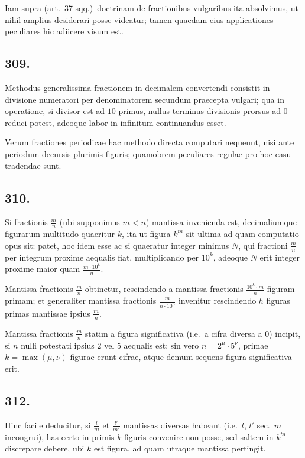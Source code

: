 \documentclass[12pt,a4paper]{article}
\theoremstyle{plain}
\theoremstyle{definition}
\theoremstyle{remark}
\begin{document}
Iam supra (art.\@~37 sqq.)\ doctrinam de fractionibus vulgaribus ita absolvimus,
ut nihil amplius desiderari posse videatur; tamen quaedam eius applicationes
peculiares hic adiicere visum est.

\subsection*{309.}

Methodus generalissima fractionem in decimalem convertendi consistit in
divisione numeratori per denominatorem secundum praecepta vulgari; qua in
operatione, si divisor est ad $10$ primus, nullus terminus divisionis prorsus
ad $0$ reduci potest, adeoque labor in infinitum continuandus esset.

Verum fractiones periodicae hac methodo directa computari nequeunt, nisi
ante periodum decursis plurimis figuris; quamobrem peculiares regulae pro hoc
casu tradendae sunt.

\subsection*{310.}

Si fractionis $\tfrac{m}{n}$ (ubi supponimus $m < n$) mantissa invenienda est,
decimaliumque figurarum multitudo quaeritur $k$, ita ut figura $k^{ta}$ sit ultima
ad quam computatio opus sit: patet, hoc idem esse ac si quaeratur integer
minimus $N$, qui fractioni $\tfrac{m}{n}$ per integrum proxime aequalis fiat, multiplicando
per $10^k$, adeoque $N$ erit integer proxime maior quam $\tfrac{m \cdot 10^k}{n}$.

Mantissa fractionis $\tfrac{m}{n}$ obtinetur, rescindendo a mantissa fractionis
$\tfrac{10^k \cdot m}{n}$ figuram primam; et generaliter mantissa fractionis $\tfrac{m}{n \cdot 10^h}$
invenitur rescindendo $h$ figuras primas mantissae ipsius $\tfrac{m}{n}$.

Mantissa fractionis $\tfrac{m}{n}$ statim a figura significativa (i.e.\ a cifra diversa
a $0$) incipit, si $n$ nulli potestati ipsius $2$ vel $5$ aequalis est; sin vero
$n = 2^\mu \cdot 5^\nu$, primae $k = \max(\mu, \nu)$ figurae erunt cifrae, atque demum
sequens figura significativa erit.

\subsection*{312.}

Hinc facile deducitur, si $\tfrac{l}{m}$ et $\tfrac{l'}{m'}$ mantissas diversas habeant
(i.e.\ $l$, $l'$ sec.\ $m$ incongrui), has certo in primis $k$ figuris convenire non
posse, sed saltem in $k^{ta}$ discrepare debere, ubi $k$ est figura, ad quam utraque
mantissa pertingit.
\end{document}
